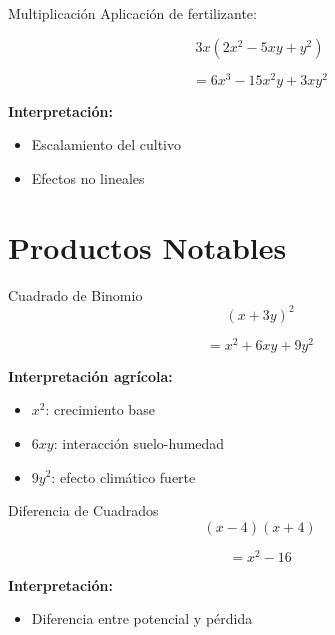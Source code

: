 \documentclass[aspectratio=169,12pt]{beamer}
\begin{document}
	\begin{frame}{Multiplicación}
		Aplicación de fertilizante:
		
		\[
		3x(2x^2 - 5xy + y^2)
		\]
		
		\pause
		
		\[
		= 6x^3 - 15x^2y + 3xy^2
		\]
		
		\pause
		
		\textbf{Interpretación:}
		\begin{itemize}
			\item Escalamiento del cultivo
			\item Efectos no lineales
		\end{itemize}
		
	\end{frame}
	
	\section{Productos Notables}
	
	\begin{frame}{Cuadrado de Binomio}
		\[
		(x + 3y)^2
		\]
		
		\pause
		
		\[
		= x^2 + 6xy + 9y^2
		\]
		
		\pause
		
		\textbf{Interpretación agrícola:}
		\begin{itemize}
			\item $x^2$: crecimiento base
			\item $6xy$: interacción suelo-humedad
			\item $9y^2$: efecto climático fuerte
		\end{itemize}
		
	\end{frame}
	
	\begin{frame}{Diferencia de Cuadrados}
		\[
		(x-4)(x+4)
		\]
		
		\pause
		
		\[
		= x^2 - 16
		\]
		
		\pause
		
		\textbf{Interpretación:}
		\begin{itemize}
			\item Diferencia entre potencial y pérdida
		\end{itemize}
		
	\end{frame}
	
\end{document}
